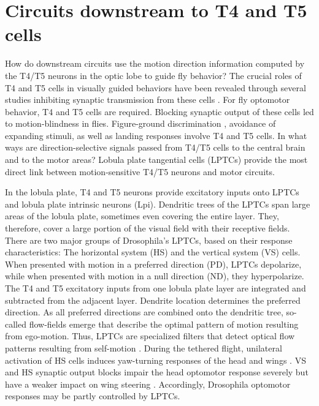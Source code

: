 \section{Circuits downstream to T4 and T5 cells}
How do downstream circuits use the motion direction information computed by the T4/T5 neurons in the optic lobe to guide fly behavior? The crucial roles of T4 and T5 cells in visually guided behaviors have been revealed through several studies inhibiting synaptic transmission from these cells \parencite{Bahl2013}. For fly optomotor behavior, T4 and T5 cells are required. Blocking synaptic output of these cells led to motion-blindness in flies. Figure-ground discrimination \parencite{Fenk2014}, avoidance of expanding stimuli, as well as landing responses \parencite{Schilling2015} involve T4 and T5 cells. In what ways are direction-selective signals passed from T4/T5 cells to the central brain and to the motor areas? Lobula plate tangential cells (LPTCs) provide the most direct link between motion-sensitive T4/T5 neurons and motor circuits. 

In the lobula plate, T4 and T5 neurons provide excitatory inputs onto LPTCs and lobula plate intrinsic neurons (Lpi). Dendritic trees of the LPTCs span large areas of the lobula plate, sometimes even covering the entire layer. They, therefore, cover a large portion of the visual field with their receptive fields. There are two major groups of Drosophila's LPTCs, based on their response characteristics: The horizontal system (HS) and the vertical system (VS) cells. When presented with motion in a preferred direction (PD), LPTCs depolarize, while when presented with motion in a null direction (ND), they hyperpolarize. The T4 and T5 excitatory inputs from one lobula plate layer are integrated and subtracted from the adjacent layer. Dendrite location determines the preferred direction. As all preferred directions are combined onto the dendritic tree, so-called flow-fields emerge that describe the optimal pattern of motion resulting from ego-motion. Thus, LPTCs are specialized filters that detect optical flow patterns resulting from self-motion \parencite{Krapp1996}. During the tethered flight, unilateral activation of HS cells induces yaw-turning responses of the head and wings \parencite{Haikala2013}. VS and HS synaptic output blocks impair the head optomotor response severely but have a weaker impact on wing steering \parencite{Kim2017}. Accordingly, Drosophila optomotor responses may be partly controlled by LPTCs.

